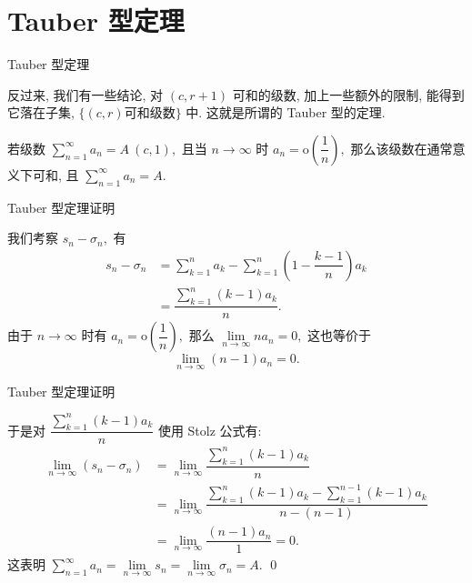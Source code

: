 
\section[Tauber 型定理]{Tauber 型定理}


\begin{frame}{Tauber 型定理}

反过来, 我们有一些结论, 对 $(c, r+1)$ 可和的级数, 加上一些额外的限制, 能得到它落在子集, $\{ (c, r) \text{可和级数} \}$ 中. 这就是所谓的 Tauber 型的定理.

\pause

\vspace*{1em}

\begin{thm}[Tauber]
若级数 $\sum\limits_{n=1}^{\infty} a_n = A~(c, 1),$ 且当 $n\to\infty$ 时 $a_n = \mathrm{o} \left( \dfrac{1}{n} \right),$ 那么该级数在通常意义下可和, 且 $\sum\limits_{n=1}^{\infty} a_n = A.$
\end{thm}

\end{frame}


\begin{frame}{Tauber 型定理证明}

我们考察 $s_n - \sigma_n,$
\pause
有
\begin{align*}
s_n - \sigma_n & = \sum\limits_{k=1}^n a_k - \sum\limits_{k=1}^n \left( 1 - \dfrac{k-1}{n} \right) a_k \\
& = \dfrac{\sum\limits_{k=1}^n (k-1)a_k}{n}.
\end{align*}
\pause
由于 $n \to \infty$ 时有 $a_n = \mathrm{o}\left( \dfrac{1}{n} \right),$ 那么 $\lim\limits_{n \to \infty} n a_n = 0,$ 这也等价于
\[\lim\limits_{n \to \infty} (n - 1) a_n = 0.\]

\end{frame}


\begin{frame}{Tauber 型定理证明}

于是对 $\dfrac{\sum\limits_{k=1}^n (k-1)a_k}{n}$ 使用 Stolz 公式有:
\begin{align*}
\lim\limits_{n \to \infty} (s_n - \sigma_n) & = \lim\limits_{n \to \infty} \dfrac{\sum\limits_{k=1}^n (k-1)a_k}{n} \\
& = \lim\limits_{n \to \infty} \dfrac{\sum\limits_{k=1}^n (k-1)a_k - \sum\limits_{k=1}^{n-1} (k-1)a_k}{n - (n-1)} \\
& = \lim\limits_{n \to \infty} \dfrac{(n-1)a_n}{1} = 0.
\end{align*}
这表明 $\sum\limits_{n=1}^{\infty} a_n = \lim\limits_{n \to \infty} s_n = \lim\limits_{n \to \infty} \sigma_n = A.$ \qed

\end{frame}

